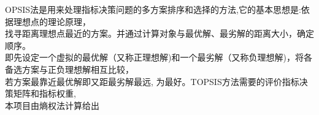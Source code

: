 \documentclass[preview]{standalone}
\begin{document}
\begin{center}
OPSIS法是用来处理指标决策问题的多方案排序和选择的方法,它的基本思想是:依据理想点的理论原理，\\找寻距离理想点最近的方案。并通过计算对象与最优解、最劣解的距离大小，确定顺序。\\即先设定一个虚拟的最优解（又称正理想解)和一个最劣解（又称负理想解)，将各备选方案与正负理想解相互比较，\\若方案最靠近最优解即又距最劣解最远, 为最好。TOPSIS方法需要的评价指标决策矩阵和指标权重,\\本项目由熵权法计算给出
\end{center}
\end{document}
